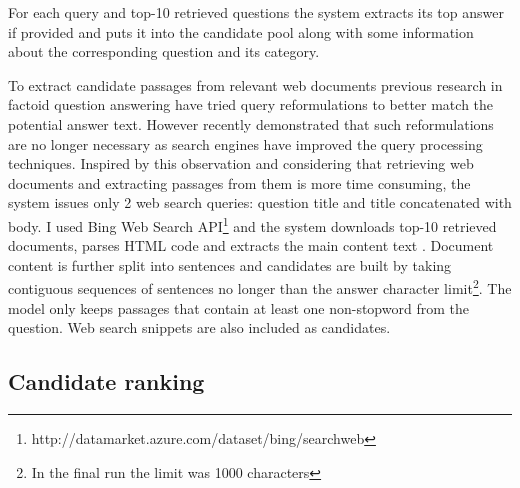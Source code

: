 \documentclass[]{article}
\begin{document}
For each query and top-10 retrieved questions the system extracts its top answer if provided and puts it into the candidate pool along with some information about the corresponding question and its category.

To extract candidate passages from relevant web documents previous research in factoid question answering have tried query reformulations \cite{Agichtein:2001:LSE:371920.371976} to better match the potential answer text.
However recently \cite{askmsr_plus15} demonstrated that such reformulations are no longer necessary as search engines have improved the query processing techniques.
Inspired by this observation and considering that retrieving web documents and extracting passages from them is more time consuming, the system issues only 2 web search queries: question title and title concatenated with body. 
I used Bing Web Search API\footnote{http://datamarket.azure.com/dataset/bing/searchweb} and the system downloads top-10 retrieved documents, parses HTML code and extracts the main content text \cite{Kohlschutter_2010}.
Document content is further split into sentences \cite{manning2014stanford} and candidates are built by taking contiguous sequences of sentences no longer than the answer character limit\footnote{In the final run the limit was 1000 characters}.
The model only keeps passages that contain at least one non-stopword from the question.
Web search snippets are also included as candidates.

\subsection{Candidate ranking}
\end{document}
